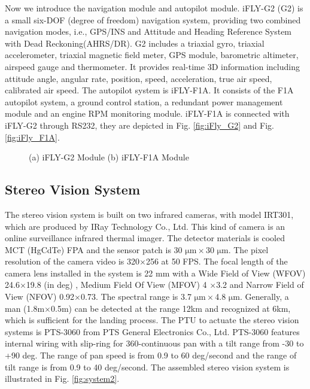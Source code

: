 \documentclass[letterpaper, 10 pt, conference]{ieeeconf}  %
\begin{document}
Now we introduce the navigation module and autopilot module. iFLY-G2 (G2) is a small six-DOF (degree of freedom) navigation system, providing two combined navigation modes, i.e., GPS/INS and Attitude and Heading Reference System with Dead Reckoning(AHRS/DR). G2 includes a triaxial gyro, triaxial accelerometer, triaxial magnetic field meter, GPS module, barometric altimeter, airspeed gauge and thermometer. It provides real-time 3D information including attitude angle, angular rate, position, speed, acceleration, true air speed, calibrated air speed. The autopilot system is iFLY-F1A. It consists of the F1A autopilot system, a ground control station, a redundant power management module and an engine RPM monitoring module. iFLY-F1A is connected with iFLY-G2 through RS232, they are depicted in Fig. \ref{fig:iFly_G2} and Fig. \ref{fig:iFly_F1A}.
   \begin{figure}[!tb]
      \centering
      \caption{(a) iFLY-G2 Module  (b) iFLY-F1A Module}
   \end{figure}
\subsection{Stereo Vision System}
The stereo vision system is built on two infrared cameras, with model IRT301, which are produced by IRay Technology Co., Ltd. This kind of camera is an online surveillance infrared thermal imager. The detector materials is cooled MCT (HgCdTe) FPA and the sensor patch is 30 $\mathrm{\mu m}\times$30 $\mathrm{\mu m}$. The pixel resolution of the camera video is 320$\times$256 at 50 FPS. The focal length of the camera lens installed in the system is 22 mm with a Wide Field of View (WFOV) 24.6$\times$19.8 (in deg) , Medium Field Of View (MFOV) 4 $\times$3.2 and Narrow Field of View (NFOV) 0.92$\times$0.73. The spectral range is 3.7 $\mathrm{\mu m}\times$4.8 $\mathrm{\mu m}$. Generally, a man (1.8m$\times$0.5m) can be detected at the range 12km and recognized at 6km, which is sufficient for the landing process.
The PTU to actuate the stereo vision systems is PTS-3060 from PTS General Electronics Co., Ltd. PTS-3060 features internal wiring with slip-ring for 360-continuous pan with a tilt range from -30 to +90 deg. The range of pan speed is from 0.9 to 60 deg/second and the range of tilt range is from 0.9 to 40 deg/second. The assembled stereo vision system is illustrated in Fig. \ref{fig:system2}.
\end{document}
